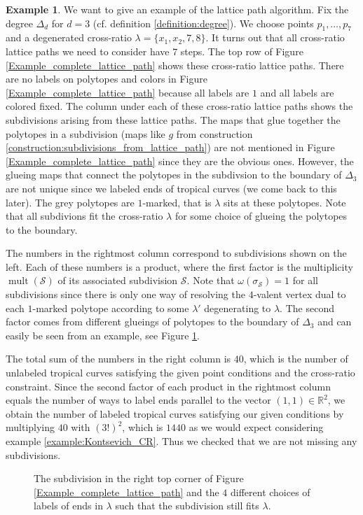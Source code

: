 \documentclass[11pt,reqno,a4]{amsart}
\theoremstyle{dotless}
\theoremstyle{definition}
\newtheorem{example}[corollary]{Example}
\newcommand{\mult}{\operatorname{mult}}
\begin{document}
\begin{example}\label{example:Kontsevich_CR_2}
We want to give an example of the lattice path algorithm. Fix the degree $\Delta_d$ for $d=3$ (cf. definition \ref{definition:degree}). We choose points $p_1,\dots,p_7$ and a degenerated cross-ratio $\lambda=\lbrace x_1,x_2,7,8\rbrace$. It turns out that all cross-ratio lattice paths we need to consider have $7$ steps. The top row of Figure \ref{Example_complete_lattice_path} shows these cross-ratio lattice paths. There are no labels on polytopes and colors in Figure \ref{Example_complete_lattice_path} because all labels are $1$ and all labels are colored fixed. The column under each of these cross-ratio lattice paths shows the subdivisions arising from these lattice paths. The maps that glue together the polytopes in a subdivision (maps like $g$ from construction \ref{construction:subdivisions_from_lattice_path}) are not mentioned in Figure \ref{Example_complete_lattice_path} since they are the obvious ones. However, the glueing maps that connect the polytopes in the subdivsion to the boundary of $\Delta_3$ are not unique since we labeled ends of tropical curves (we come back to this later). The grey polytopes are $1$-marked, that is $\lambda$ sits at these polytopes. Note that all subdivions fit the cross-ratio $\lambda$ for some choice of glueing the polytopes to the boundary.

The numbers in the rightmost column correspond to subdivisions shown on the left. Each of these numbers is a product, where the first factor is the multiplicity $\mult(\mathcal{S})$ of its associated subdivision $\mathcal{S}$. Note that $\omega (\sigma_\mathcal{S})=1$ for all subdivisions since there is only one way of resolving the $4$-valent vertex dual to each $1$-marked polytope according to some $\lambda'$ degenerating to $\lambda$. The second factor comes from different glueings of polytopes to the boundary of $\Delta_3$ and can easily be seen from an example, see Figure \ref{Example_complete_lattice_path_2}.

The total sum of the numbers in the right column is $40$, which is the number of unlabeled tropical curves satisfying the given point conditions and the cross-ratio constraint. Since the second factor of each product in the rightmost column equals the number of ways to label ends parallel to the vector $(1,1)\in\mathbb{R}^2$, we obtain the number of labeled tropical curves satisfying our given conditions by multiplying $40$ with $\left( 3!\right)^2$, which is $1440$ as we would expect considering example \ref{example:Kontsevich_CR}. Thus we checked that we are not missing any subdivisions.



\begin{figure}[H]
\centering
\def\svgwidth{380pt}

\caption{The subdivision in the right top corner of Figure \ref{Example_complete_lattice_path} and the $4$ different choices of labels of ends in $\lambda$ such that the subdivision still fits $\lambda$.}
\label{Example_complete_lattice_path_2}
\end{figure}

\end{example}
\end{document}
